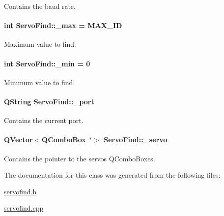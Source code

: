 Contains the baud rate. 

\hypertarget{a00008_abb4bcc300ab0a9c1df3c41b4e7d1fe2d}{}
\paragraph[{\+\_\+max}]{\setlength{\rightskip}{0pt plus 5cm}int Servo\+Find\+::\+\_\+max = M\+A\+X\+\_\+\+I\+D\hspace{0.3cm}{\ttfamily [private]}}\label{a00008_abb4bcc300ab0a9c1df3c41b4e7d1fe2d}


Maximum value to find. 

\hypertarget{a00008_a65a3d5606c9a8bcd6ace9be36c3551e1}{}
\paragraph[{\+\_\+min}]{\setlength{\rightskip}{0pt plus 5cm}int Servo\+Find\+::\+\_\+min = 0\hspace{0.3cm}{\ttfamily [private]}}\label{a00008_a65a3d5606c9a8bcd6ace9be36c3551e1}


Minimum value to find. 

\hypertarget{a00008_acc6d9f94a8cf7a7a777fd9c818d98207}{}
\paragraph[{\+\_\+port}]{\setlength{\rightskip}{0pt plus 5cm}Q\+String Servo\+Find\+::\+\_\+port\hspace{0.3cm}{\ttfamily [private]}}\label{a00008_acc6d9f94a8cf7a7a777fd9c818d98207}


Contains the current port. 

\hypertarget{a00008_a571ee1fc45255666e5baa0d5e9111551}{}
\paragraph[{\+\_\+servo}]{\setlength{\rightskip}{0pt plus 5cm}Q\+Vector$<$Q\+Combo\+Box $\ast$$>$ Servo\+Find\+::\+\_\+servo\hspace{0.3cm}{\ttfamily [private]}}\label{a00008_a571ee1fc45255666e5baa0d5e9111551}


Contains the pointer to the servos Q\+Combo\+Boxes. 



The documentation for this class was generated from the following files\+:\begin{DoxyCompactItemize}
\item 
\hyperlink{a00022}{servofind.\+h}\item 
\hyperlink{a00021}{servofind.\+cpp}\end{DoxyCompactItemize}

